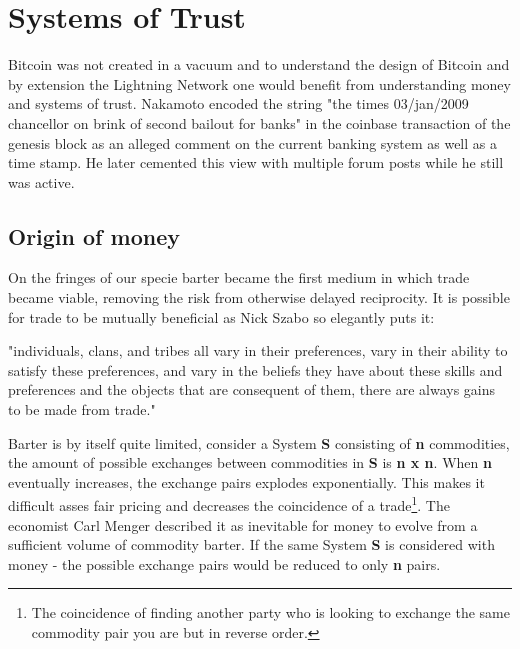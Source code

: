 \section{Systems of Trust}
\label{sec:macroeconomics}

Bitcoin was not created in a vacuum and to understand the design of Bitcoin and by extension the Lightning Network one would
benefit from understanding money and systems of trust. Nakamoto encoded the string "the times 03/jan/2009 chancellor on brink of second bailout for banks"\cite{repository:bitcoin:sourceforge}\cite{bitcoin:genesis:coinbase} in the coinbase transaction of the genesis block as an alleged comment on the current banking system as well as a time stamp. He later cemented this view with multiple forum posts while he still was active\cite{nakamoto:post:deflation}\cite{nakamoto:govern:print}.

\subsection{Origin of money}

On the fringes of our specie barter became the first medium in which trade became viable, removing the risk from otherwise delayed reciprocity. It is possible for trade to be mutually beneficial as Nick Szabo so elegantly puts it:

\begin{displayquote}

"individuals, clans, and tribes all vary in their preferences, vary in their ability to satisfy these preferences, and vary in the beliefs they have about these skills and preferences and the objects that are consequent of them, there are always gains to be made from trade."\cite{szabo:shelling:out}

\end{displayquote}

Barter is by itself quite limited, consider a System \textbf{S}
consisting of \textbf{n} commodities, the amount of possible exchanges between commodities in \textbf{S} is \textbf{n x n}. When \textbf{n} eventually increases, the exchange pairs explodes exponentially. This makes it difficult asses fair pricing and decreases the coincidence of a trade\footnote{The coincidence of finding another party who is looking to exchange the same commodity pair you are but in reverse order.}. The economist Carl Menger described it as inevitable for money to evolve from a sufficient volume of commodity barter\cite{menger:origins:money}. If the same System \textbf{S} is considered with money - the possible exchange pairs would be reduced to only \textbf{n} pairs. 

